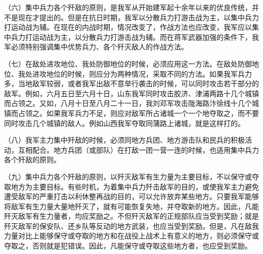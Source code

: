 （六）集中兵力各个歼敌的原则，是我军从开始建军起十余年以来的优良传统，并不是现在才提出的。但是在抗日时期，我军以分散兵力打游击战为主，以集中兵力打运动战为辅。在现在的内战时期，情况改变了，作战方法也应改变，我军应以集中兵力打运动战为主，以分散兵力打游击战为辅。而在蒋军武器加强的条件下，我军必须特别强调集中优势兵力、各个歼灭敌人的作战方法。

（七）在敌处进攻地位、我处防御地位的时候，必须应用这一方法。在敌处防御地位、我处进攻地位的时候，则应分为两种情况，采取不同的方法。如果我军兵力多，当地敌军较弱，或者我军出敌不意举行袭击的时候，可以同时攻击若干部分的敌军。例如，六月五日至六月十日，山东我军同时攻击胶济、津浦两路十几个城镇而占领之。又如，八月十日至八月二十一日，我刘邓军攻击陇海路汴徐线十几个城镇而占领之。如果我军兵力不足，则应对敌军所占诸城一个一个地夺取之，而不要同时攻击几个城镇的敌人。例如山西我军夺取同蒲路上诸城，就是这样打的。

（八）我军主力集中歼敌的时候，必须同地方兵团、地方游击队和民兵的积极活动，互相配合。地方兵团（或部队）在打敌一团一营一连的时候，也适用集中兵力各个歼敌的原则。

（九）集中兵力各个歼敌的原则，以歼灭敌军有生力量为主要目标，不以保守或夺取地方为主要目标。有些时机，为着集中兵力歼击敌军的目的，或使我军主力避免遭受敌军的严重打击以利休整再战的目的，可以允许放弃某些地方。只要我军能够将敌军有生力量大量地歼灭了，就有可能恢复失地，并夺取新的地方。因此，凡能歼灭敌军有生力量者，均应奖励之。不但歼灭敌军的正规部队应当受到奖励；就是歼灭敌军的保安队、还乡队等反动的地方武装，也应当受到奖励。但是，凡在敌我力量对比上能够保守或夺取的地方和在战役上战术上有意义的地方，则必须保守或夺取之，否则就是犯错误。因此，凡能保守或夺取这些地方者，也应受到奖励。


